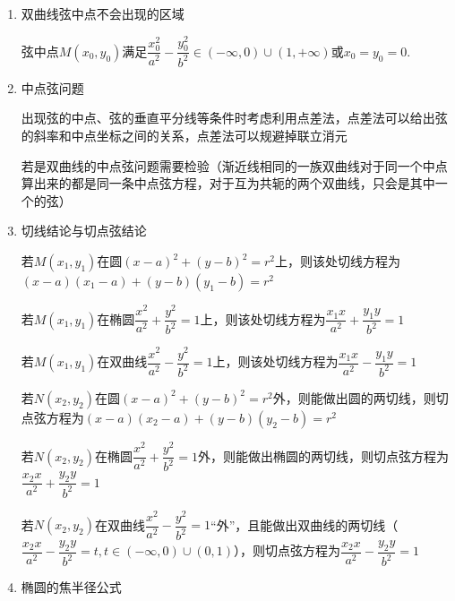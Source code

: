 \begin{enumerate}
\begin{jieda}
        $P(x_0, y_0)$在$\dfrac{x^2}{a^2} - \dfrac{y^2}{b^2} = 1$无渐近线一侧$\Longleftrightarrow \dfrac{x_0^2}{a^2} - \dfrac{y_0^2}{b^2} > 1$
    \end{jieda}

    \item 双曲线弦中点不会出现的区域
    \begin{jieda}
        弦中点$M(x_0, y_0)$满足$\dfrac{x_0^2}{a^2} - \dfrac{y_0^2}{b^2} \in (-\infty, 0) \cup (1, +\infty)$或$x_0 = y_0 = 0$.
    \end{jieda}

    \item 中点弦问题
    \begin{jieda}
        出现弦的中点、弦的垂直平分线等条件时考虑利用点差法，点差法可以给出弦的斜率和中点坐标之间的关系，点差法可以规避掉联立消元

        若是双曲线的中点弦问题需要检验（渐近线相同的一族双曲线对于同一个中点算出来的都是同一条中点弦方程，对于互为共轭的两个双曲线，只会是其中一个的弦）
    \end{jieda}

    \item 切线结论与切点弦结论
    \begin{jieda}
        若$M(x_1, y_1)$在圆$(x-a)^2+(y-b)^2 = r^2$上，则该处切线方程为$(x-a)(x_1-a)+(y-b)(y_1-b) = r^2$

        若$M(x_1, y_1)$在椭圆$\dfrac{x^2}{a^2} + \dfrac{y^2}{b^2} = 1$上，则该处切线方程为$\dfrac{x_1x}{a^2} + \dfrac{y_1y}{b^2} = 1$

        若$M(x_1, y_1)$在双曲线$\dfrac{x^2}{a^2} - \dfrac{y^2}{b^2} = 1$上，则该处切线方程为$\dfrac{x_1x}{a^2} - \dfrac{y_1y}{b^2} = 1$

        
        若$N(x_2, y_2)$在圆$(x-a)^2+(y-b)^2 = r^2$外，则能做出圆的两切线，则切点弦方程为$(x-a)(x_2-a)+(y-b)(y_2-b) = r^2$

        若$N(x_2, y_2)$在椭圆$\dfrac{x^2}{a^2} + \dfrac{y^2}{b^2} = 1$外，则能做出椭圆的两切线，则切点弦方程为$\dfrac{x_2x}{a^2} + \dfrac{y_2y}{b^2} = 1$

        若$N(x_2, y_2)$在双曲线$\dfrac{x^2}{a^2} - \dfrac{y^2}{b^2} = 1$“外”，且能做出双曲线的两切线（$\dfrac{x_2x}{a^2} - \dfrac{y_2y}{b^2} = t, t \in (-\infty, 0)\cup(0, 1)$），则切点弦方程为$\dfrac{x_2x}{a^2} - \dfrac{y_2y}{b^2} = 1$
    \end{jieda}

    \item 椭圆的焦半径公式
    \begin{jieda}
\end{jieda}
\end{enumerate}
